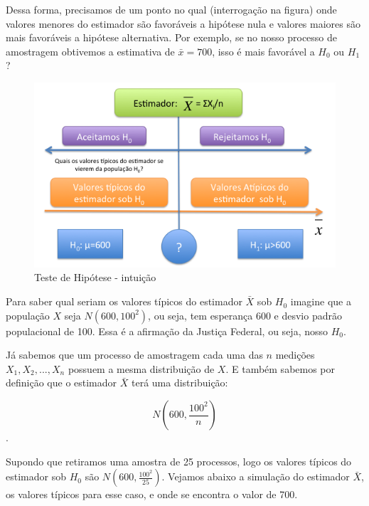 \documentclass[
  letterpaper,
  DIV=11,
  numbers=noendperiod]{scrreprt}
\begin{document}
Dessa forma, precisamos de um ponto no qual (interrogação na figura)
onde valores menores do estimador são favoráveis a hipótese nula e
valores maiores são mais favoráveis a hipótese alternativa. Por exemplo,
se no nosso processo de amostragem obtivemos a estimativa de
\(\bar{x}=700\), isso é mais favorável a \(H_0\) ou \(H_1\)?

\begin{figure}[H]

{\centering \includegraphics[width=0.8\linewidth,height=\textheight,keepaspectratio]{figuras/testehipot1.png}

}

\caption{Teste de Hipótese - intuição \label{testehipo1}}

\end{figure}%

Para saber qual seriam os valores típicos do estimador \(\bar{X}\) sob
\(H_0\) imagine que a população \(X\) seja \(N(600,100^2)\), ou seja,
tem esperança 600 e desvio padrão populacional de 100. Essa é a
afirmação da Justiça Federal, ou seja, nosso \(H_0\).

Já sabemos que um processo de amostragem cada uma das \(n\) medições
\(X_1, X_2, ...,X_n\) possuem a mesma distribuição de \(X\). E também
sabemos por definição que o estimador \(\bar{X}\) terá uma distribuição:

\[N(600,\frac{100^2}{n})\].

Supondo que retiramos uma amostra de 25 processos, logo os valores
típicos do estimador sob \(H_0\) são \(N(600,\frac{100^2}{25})\).
Vejamos abaixo a simulação do estimador \(\bar{X}\), os valores típicos
para esse caso, e onde se encontra o valor de 700.
\end{document}
